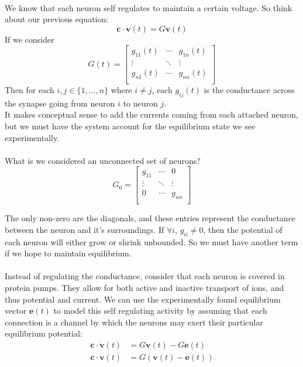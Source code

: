 \documentclass{article}
\begin{document}
\paragraph{}
We know that each neuron self regulates to maintain a certain voltage. So think about our previous equation:
\[ \mathbf{c}\cdot\dot{\mathbf{v}}(t) = G\mathbf{v}(t) \]
If we consider
\[ G(t) =
\begin{bmatrix}
g_{11}(t) & \cdots & g_{1n}(t) \\
\vdots & \ddots & \vdots \\
g_{n1}(t) & \cdots & g_{nn}(t) \\
\end{bmatrix}
\]
Then for each $i,j \in \{ 1, \dots, n \}$ where $i \ne j$, each $g_{ij}(t)$  is the conductance across the synapse going from neuron $i$ to neuron $j$.\\

It makes conceptual sense to add the currents coming from each attached neuron, but we must have the system account for the equilibrium state we see experimentally.

\paragraph{}
What is we considered an unconnected set of neurons?
\[ G_{0} =
\begin{bmatrix}
g_{11} & \cdots & 0\\
\vdots & \ddots & \vdots \\
0 & \cdots & g_{nn} \\
\end{bmatrix}
\]

The only non-zero are the diagonals, and these entries represent the conductance between the neuron and it's surroundings. If $\forall i$, $g_{ii} \ne 0$, then the potential of each neuron will either grow or shrink unbounded. So we must have another term if we hope to maintain equilibrium.

\paragraph{}
Instead of regulating the conductance, consider that each neuron is covered in protein pumps. They allow for both active and inactive transport of ions, and thus potential and current. We can use the experimentally found equilibrium vector $\mathbf{e}(t)$ to model this self regulating activity by assuming that each connection is a channel by which the neurons may exert their particular equilibrium potential:
\begin{align*}
\mathbf{c}\cdot\dot{\mathbf{v}}(t) &= G\mathbf{v}(t) -G\mathbf{e}(t) \\
\mathbf{c}\cdot\dot{\mathbf{v}}(t) &= G\left( \mathbf{v}(t) - \mathbf{e}(t)\right)
\end{align*}
\end{document}
